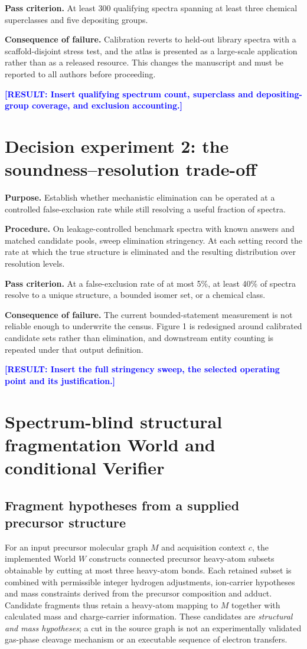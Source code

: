 \documentclass[12pt]{article}
\newcommand{\result}[1]{\textbf{\textcolor{blue}{[RESULT: #1]}}}
\begin{document}
\textbf{Pass criterion.} At least 300 qualifying spectra spanning at least three chemical superclasses and five depositing groups.

\textbf{Consequence of failure.} Calibration reverts to held-out library spectra with a scaffold-disjoint stress test, and the atlas is presented as a large-scale application rather than as a released resource. This changes the manuscript and must be reported to all authors before proceeding.

\result{Insert qualifying spectrum count, superclass and depositing-group coverage, and exclusion accounting.}

\section{Decision experiment 2: the soundness--resolution trade-off}

\textbf{Purpose.} Establish whether mechanistic elimination can be operated at a controlled false-exclusion rate while still resolving a useful fraction of spectra.

\textbf{Procedure.} On leakage-controlled benchmark spectra with known answers and matched candidate pools, sweep elimination stringency. At each setting record the rate at which the true structure is eliminated and the resulting distribution over resolution levels.

\textbf{Pass criterion.} At a false-exclusion rate of at most 5\%, at least 40\% of spectra resolve to a unique structure, a bounded isomer set, or a chemical class.

\textbf{Consequence of failure.} The current bounded-statement measurement is not reliable enough to underwrite the census. Figure 1 is redesigned around calibrated candidate sets rather than elimination, and downstream entity counting is repeated under that output definition.

\result{Insert the full stringency sweep, the selected operating point and its justification.}

\section{Spectrum-blind structural fragmentation World and conditional Verifier}

\subsection{Fragment hypotheses from a supplied precursor structure}
For an input precursor molecular graph $M$ and acquisition context $c$, the implemented World $W$ constructs connected precursor heavy-atom subsets obtainable by cutting at most three heavy-atom bonds. Each retained subset is combined with permissible integer hydrogen adjustments, ion-carrier hypotheses and mass constraints derived from the precursor composition and adduct. Candidate fragments thus retain a heavy-atom mapping to $M$ together with calculated mass and charge-carrier information. These candidates are \emph{structural and mass hypotheses}; a cut in the source graph is not an experimentally validated gas-phase cleavage mechanism or an executable sequence of electron transfers.
\end{document}
